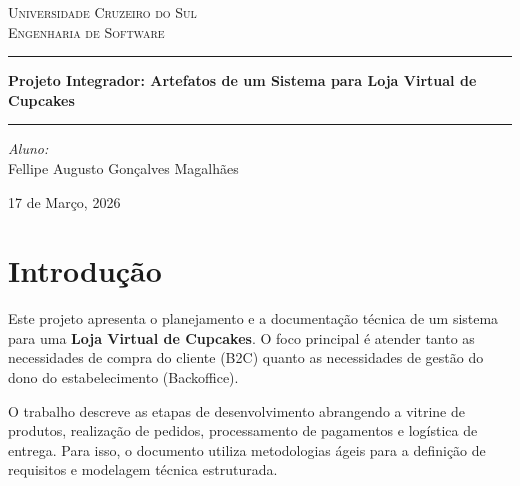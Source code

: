 \documentclass[12pt]{article}
\begin{document}
\begin{titlepage}
    \center
    \textsc{\Large Universidade Cruzeiro do Sul}\\[1.0cm]
    \textsc{\Large Engenharia de Software}\\[0.5cm]
    
    \vspace{2.5cm}
    
    \hrule
    \vspace{0.4cm}
    {\huge \bfseries Projeto Integrador: Artefatos de um Sistema para Loja Virtual de Cupcakes}\\[0.4cm]
    \hrule
    
    \vspace{3.5cm}
    
    \begin{flushleft} 
        \Large \emph{Aluno:}\\ 
        Fellipe Augusto Gonçalves Magalhães
    \end{flushleft}
    
    \vfill
    
    {\large 17 de Março, 2026}
\end{titlepage}

\newpage
\section{Introdução}
Este projeto apresenta o planejamento e a documentação técnica de um sistema para uma \textbf{Loja Virtual de Cupcakes}. O foco principal é atender tanto as necessidades de compra do cliente (B2C) quanto as necessidades de gestão do dono do estabelecimento (Backoffice).

O trabalho descreve as etapas de desenvolvimento abrangendo a vitrine de produtos, realização de pedidos, processamento de pagamentos e logística de entrega. Para isso, o documento utiliza metodologias ágeis para a definição de requisitos e modelagem técnica estruturada.

\newpage
\end{document}
